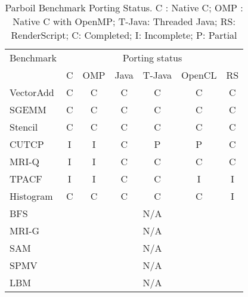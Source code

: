 \begin{table}[h]\small
\centering
\begin{tabular}{ | l | c | c | c | c | c | c |}
    \hline 
    Benchmark & \multicolumn{6}{|c|}{Porting status} \\ \cline{2-7}
                      & C & OMP & Java & T-Java & OpenCL & RS \\ \hline
    VectorAdd         & C & C   & C    & C      & C      & C \\ \hline
    SGEMM             & C & C   & C    & C      & C      & C \\ \hline
    Stencil           & C & C   & C    & C      & C      & C \\ \hline
    CUTCP             & I & I   & C    & P      & P      & C \\ \hline
    MRI-Q             & I & I   & C    & C      & C      & C \\ \hline
    TPACF             & I & I   & C    & C      & I      & I \\ \hline
    Histogram         & C & C   & C    & C      & C      & I \\ \hline
    BFS               & \multicolumn{6}{|c|}{N/A} \\ \hline
    MRI-G             & \multicolumn{6}{|c|}{N/A} \\ \hline
    SAM               & \multicolumn{6}{|c|}{N/A} \\ \hline
    SPMV              & \multicolumn{6}{|c|}{N/A} \\ \hline
    LBM               & \multicolumn{6}{|c|}{N/A} \\ \hline
    \hline
\end{tabular}
\caption{Parboil Benchmark Porting Status. C : Native C; OMP : Native C with
OpenMP; T-Java: Threaded Java; RS: RenderScript; C: Completed; I: Incomplete; P:
Partial}
\label{table:parboil}
\end{table}

